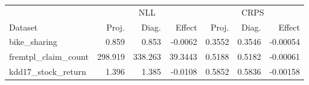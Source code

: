 \begin{tabular}{lrrrrrr}
\toprule & \multicolumn{3}{c}{NLL} & \multicolumn{3}{c}{CRPS} \\
Dataset & Proj. & Diag. & Effect & Proj. & Diag. & Effect \\
\midrule
bike\_sharing & 0.859 & 0.853 & -0.0062 & 0.3552 & 0.3546 & -0.00054 \\
fremtpl\_claim\_count & 298.919 & 338.263 & 39.3443 & 0.5188 & 0.5182 & -0.00061 \\
kdd17\_stock\_return & 1.396 & 1.385 & -0.0108 & 0.5852 & 0.5836 & -0.00158 \\
\bottomrule
\end{tabular}
